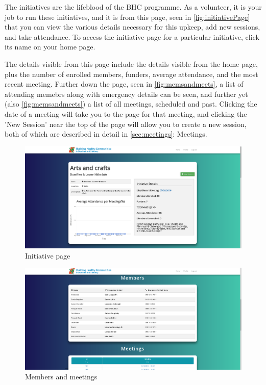 \documentclass{bhcguides}
\begin{document}
The initiatives are the lifeblood of the BHC programme. As a volunteer, it is your job to run these initiatives, and it is from this page, seen in \autoref{fig:initiativePage} that you can view the various details necessary for this upkeep, add new sessions, and take attendance. To access the initiative page for a particular initiative, click its name on your home page.

The details visible from this page include the details visible from the home page, plus the number of enrolled members, funders, average attendance, and the most recent meeting. Further down the page, seen in \autoref{fig:memsandmeets}, a list of attending memebrs along with emergency details can be seen, and further yet (also \autoref{fig:memsandmeets}) a list of all meetings, scheduled and past. Clicking the date of a meeting will take you to the page for that meeting, and clicking the 'New Session' near the top of the page will allow you to create a new session, both of which are described in detail in \autoref{sec:meetings}: Meetings.

\begin{figure}[h]
 \centerline{\includegraphics[width=\textwidth, height=\textheight, keepaspectratio]{initiativepage.png}}
 \caption{Initiative page}
 \label{fig:initiativePage}
\end{figure}

\begin{figure}[h]
 \centerline{\includegraphics[width=\textwidth, height=\textheight, keepaspectratio]{membersandmeetings.png}}
 \caption{Members and meetings}
 \label{fig:memsandmeets}
\end{figure}
\end{document}
